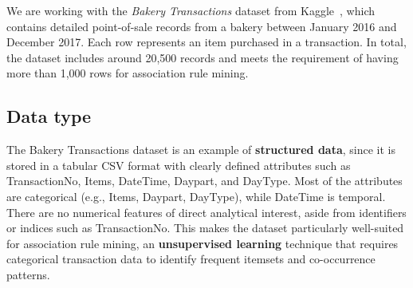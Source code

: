 \label{chap:data-understanding}

We are working with the \textit{Bakery Transactions} dataset from Kaggle~\cite{bakerydata}, which contains detailed point-of-sale records from a bakery between January 2016 and December 2017. 
Each row represents an item purchased in a transaction. 
In total, the dataset includes around 20,500 records and meets the requirement of having more than 1,000 rows for association rule mining.  

\subsection*{Data type}
The Bakery Transactions dataset is an example of \textbf{structured data}, 
since it is stored in a tabular CSV format with clearly defined attributes such as 
TransactionNo, Items, DateTime, Daypart, and DayType.  
Most of the attributes are categorical (e.g., Items, Daypart, DayType), 
while DateTime is temporal.  
There are no numerical features of direct analytical interest, aside from identifiers 
or indices such as TransactionNo.  
This makes the dataset particularly well-suited for association rule mining, 
an \textbf{unsupervised learning} technique that requires categorical transaction 
data to identify frequent itemsets and co-occurrence patterns.

